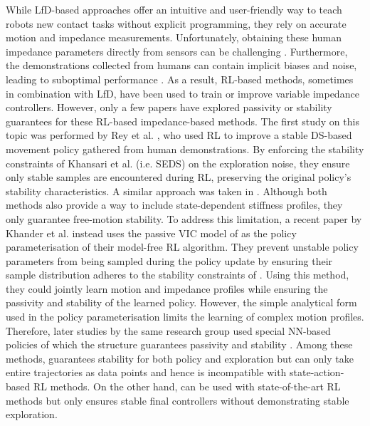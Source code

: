 While LfD-based approaches offer an intuitive and user-friendly way to teach robots new contact tasks without explicit programming, they rely on accurate motion and impedance measurements. Unfortunately, obtaining these human impedance parameters directly from sensors can be challenging \cite{zhangNeuralNetworkBased2023,abu-dakkaVariableImpedanceControl2020,jinModelPredictiveVariable2023}. 
Furthermore, the demonstrations collected from humans can contain implicit biases and noise, leading to suboptimal performance \cite{kimReinforcementLearningBased2020,reyLearningMotionsDemonstrations2018,abu-dakkaVariableImpedanceControl2020,xieRobotLearningDemonstration2020}. As a result, RL-based methods, sometimes in combination with LfD, \cite{buchliLearningVariableImpedance2011,abu-dakkaVariableImpedanceControl2020,saverianoDynamicMovementPrimitives2021,elguea-aguinacoReviewReinforcementLearning2023} have been used to train or improve variable impedance controllers. However, only a few papers have explored passivity or stability guarantees for these RL-based impedance-based methods. The first study on this topic was performed by Rey et al. \cite{reyLearningMotionsDemonstrations2018}, who used RL to improve a stable DS-based movement policy gathered from human demonstrations. By enforcing the stability constraints of Khansari et al. \cite{khansari-zadehLearningStableNonlinear2011} (i.e. SEDS) on the exploration noise, they ensure only stable samples are encountered during RL, preserving the original policy's stability characteristics. A similar approach was taken in \cite{huRobotPolicyImprovement2022}. Although both methods also provide a way to include state-dependent stiffness profiles, they only guarantee free-motion stability. To address this limitation, a recent paper by Khander et al. \cite{khaderStabilityGuaranteedReinforcementLearning2020} instead uses the passive VIC model of \cite{khansari-zadehModelingRobotDiscrete2014} as the policy parameterisation of their model-free RL algorithm. They prevent unstable policy parameters from being sampled during the policy update by ensuring their sample distribution adheres to the stability constraints of \cite{khansari-zadehModelingRobotDiscrete2014}. Using this method, they could jointly learn motion and impedance profiles while ensuring the passivity and stability of the learned policy. However, the simple analytical form used in the policy parameterisation limits the learning of complex motion profiles. Therefore, later studies by the same research group used special NN-based policies of which the structure guarantees passivity and stability \cite{khaderLearningStableNormalizingFlow2021,khaderLearningDeepNeural2021}. Among these methods, \cite{khaderLearningDeepNeural2021} guarantees stability for both policy and exploration but can only take entire trajectories as data points and hence is incompatible with state-action-based RL methods. On the other hand, \cite{khaderLearningStableNormalizingFlow2021} can be used with state-of-the-art RL methods but only ensures stable final controllers without demonstrating stable exploration.
